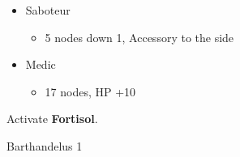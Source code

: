 \begin{paracol}{2}
\begin{menu}
\begin{itemize}
\begin{itemize}
\begin{itemize}
					      \item Saboteur
					            \begin{itemize}
						            \item 5 nodes down 1, Accessory to the side
					            \end{itemize}
					      \item Medic
					            \begin{itemize}
						            \item 17 nodes, HP +10
					            \end{itemize}
				      \end{itemize}
			\end{itemize}

		\end{itemize}
	\end{menu}
	\switchcolumn*
	 Activate \textbf{Fortisol}.


	\renewcommand{\first}{[1] Strike Team (\com/\syn/\com)}
	\renewcommand{\second}{[2] Tri-Disaster (\rav/\rav/\rav)}
	\renewcommand{\third}{[3] Tri-Disaster (\rav/\rav/\rav)}
	\renewcommand{\fourth}{[4] Cerberus (\com/\com/\com)}
	\renewcommand{\fifth}{[5] Cerberus (\com/\com/\com)}
	\begin{battle}{Barthandelus 1}


\end{battle}
\end{paracol}
